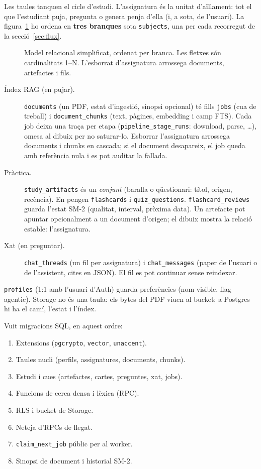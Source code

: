 Les taules tanquen el cicle d'estudi. L'assignatura és la unitat d'aïllament: tot el que l'estudiant puja, pregunta o genera penja d'ella (i, a sota, de l'usuari). La figura~\ref{fig:er} ho ordena en \textbf{tres branques} sota \texttt{subjects}, una per cada recorregut de la secció~\ref{sec:flux}.

\begin{figure}[!ht]
\centering

\caption{Model relacional simplificat, ordenat per branca. Les fletxes són cardinalitats 1--N. L'esborrat d'assignatura arrossega documents, artefactes i fils.}
\label{fig:er}
\end{figure}

\begin{description}
  \item[Índex RAG (en pujar).] \texttt{documents} (un PDF, estat d'ingestió, sinopsi opcional) té fills \texttt{jobs} (cua de treball) i \texttt{document\_chunks} (text, pàgines, embedding i camp FTS). Cada job deixa una traça per etapa (\texttt{pipeline\_stage\_runs}: download, parse, \ldots), omesa al dibuix per no saturar-lo. Esborrar l'assignatura arrossega documents i chunks en cascada; si el document desapareix, el job queda amb referència nula i es pot auditar la fallada.
  \item[Pràctica.] \texttt{study\_artifacts} és un \emph{conjunt} (baralla o qüestionari: títol, origen, recència). En pengen \texttt{flashcards} i \texttt{quiz\_questions}. \texttt{flashcard\_reviews} guarda l'estat SM-2 (qualitat, interval, pròxima data). Un artefacte pot apuntar opcionalment a un document d'origen; el dibuix mostra la relació estable: l'assignatura.
  \item[Xat (en preguntar).] \texttt{chat\_threads} (un fil per assignatura) i \texttt{chat\_messages} (paper de l'usuari o de l'assistent, cites en JSON). El fil es pot continuar sense reindexar.
\end{description}

\texttt{profiles} (1:1 amb l'usuari d'Auth) guarda preferències (nom visible, flag agentic). Storage no és una taula: els bytes del PDF viuen al bucket; a Postgres hi ha el camí, l'estat i l'índex.

Vuit migracions SQL, en aquest ordre:

\begin{enumerate}[label=000\arabic*.]
  \item Extensions (\texttt{pgcrypto}, \texttt{vector}, \texttt{unaccent}).
  \item Taules nucli (perfils, assignatures, documents, chunks).
  \item Estudi i cues (artefactes, cartes, preguntes, xat, jobs).
  \item Funcions de cerca densa i lèxica (RPC).
  \item RLS i bucket de Storage.
  \item Neteja d'RPCs de llegat.
  \item \texttt{claim\_next\_job} públic per al worker.
  \item Sinopsi de document i historial SM-2.
\end{enumerate}

